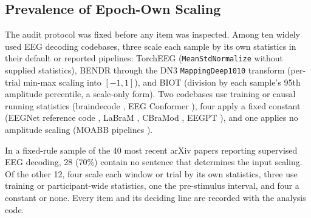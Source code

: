 \subsection{Prevalence of Epoch-Own Scaling}
The audit protocol was fixed before any item was inspected. Among ten widely used EEG decoding codebases, three scale each sample by its own statistics in their default or reported pipelines: TorchEEG \cite{zhang2024torcheeg} (\texttt{MeanStdNormalize} without supplied statistics), BENDR through the DN3 \texttt{MappingDeep1010} transform (per-trial min-max scaling into $[-1,1]$), and BIOT (division by each sample's 95th amplitude percentile, a scale-only form). Two codebases use training or causal running statistics (braindecode \cite{schirrmeister2017deep}, EEG Conformer \cite{song2023conformer}), four apply a fixed constant (EEGNet reference code \cite{lawhern2018eegnet}, LaBraM \cite{jiang2024labram}, CBraMod \cite{wang2025cbramod}, EEGPT \cite{wang2024eegpt}), and one applies no amplitude scaling (MOABB pipelines \cite{jayaram2018moabb}).

In a fixed-rule sample of the 40 most recent arXiv papers reporting supervised EEG decoding, 28 (70\%) contain no sentence that determines the input scaling. Of the other 12, four scale each window or trial by its own statistics, three use training or participant-wide statistics, one the pre-stimulus interval, and four a constant or none. Every item and its deciding line are recorded with the analysis code.
